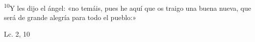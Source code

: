 \documentclass[../../rosario.tex]{subfiles}
\begin{document}
    \textsuperscript{10}Y les dijo el ángel: «no temáis, pues he aquí que os traigo una buena nueva, que será de grande alegría para todo el pueblo:»
    \begin{flushright}
    Lc. 2, 10         
    \end{flushright}
\end{document}
